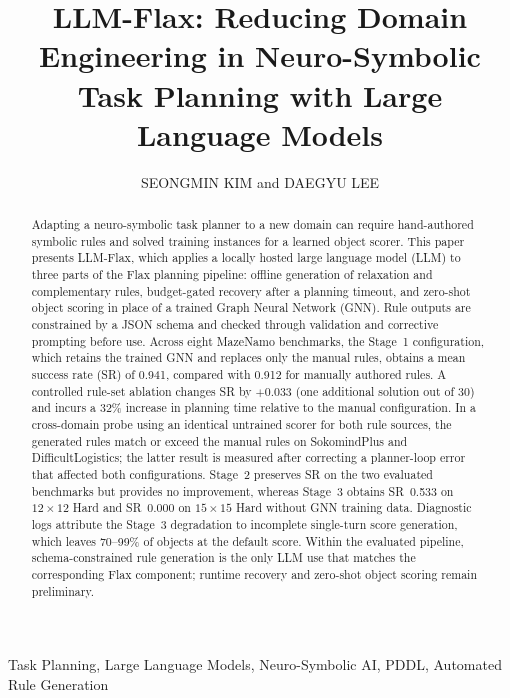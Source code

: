 \documentclass{ieeeaccess}
\title{LLM-Flax: Reducing Domain Engineering in Neuro-Symbolic Task Planning with Large Language Models}
\author{%
\uppercase{Seongmin Kim}\authorrefmark{1} and
\uppercase{Daegyu Lee}\authorrefmark{2}%
}
\newcommand{\method}{LLM-Flax\xspace}
\begin{document}
\begin{abstract}
Adapting a neuro-symbolic task planner to a new domain can require hand-authored symbolic rules and solved training instances for a learned object scorer.
This paper presents \method, which applies a locally hosted large language model (LLM) to three parts of the Flax planning pipeline: offline generation of relaxation and complementary rules, budget-gated recovery after a planning timeout, and zero-shot object scoring in place of a trained Graph Neural Network (GNN).
Rule outputs are constrained by a JSON schema and checked through validation and corrective prompting before use.
Across eight MazeNamo benchmarks, the Stage~1 configuration, which retains the trained GNN and replaces only the manual rules, obtains a mean success rate (SR) of 0.941, compared with 0.912 for manually authored rules.
A controlled rule-set ablation changes SR by $+0.033$ (one additional solution out of 30) and incurs a 32\% increase in planning time relative to the manual configuration.
In a cross-domain probe using an identical untrained scorer for both rule sources, the generated rules match or exceed the manual rules on SokomindPlus and DifficultLogistics; the latter result is measured after correcting a planner-loop error that affected both configurations.
Stage~2 preserves SR on the two evaluated benchmarks but provides no improvement, whereas Stage~3 obtains SR~0.533 on $12{\times}12$ Hard and SR~0.000 on $15{\times}15$ Hard without GNN training data.
Diagnostic logs attribute the Stage~3 degradation to incomplete single-turn score generation, which leaves 70--99\% of objects at the default score.
Within the evaluated pipeline, schema-constrained rule generation is the only LLM use that matches the corresponding Flax component; runtime recovery and zero-shot object scoring remain preliminary.
\end{abstract}

\begin{keywords}
Task Planning, Large Language Models, Neuro-Symbolic AI, PDDL, Automated Rule Generation
\end{keywords}

\titlepgskip=-15pt
\end{document}
